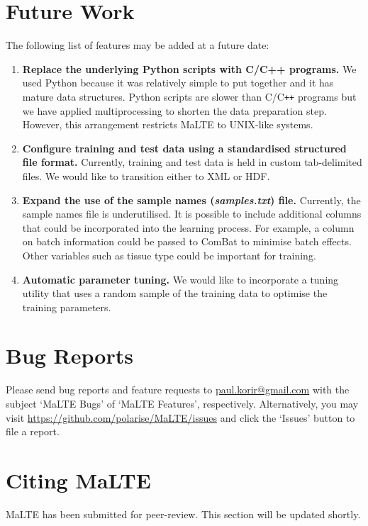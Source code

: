 \documentclass[a4paper,12pt]{article}
\begin{document}
\section{Future Work}
\label{future}
The following list of features may be added at a future date:
\begin{enumerate}
\item \textbf{Replace the underlying \textsf{Python} scripts with C/C++ programs.} We used \textsf{Python} because it was relatively simple to put together and it has mature data structures. \textsf{Python} scripts are slower than \textsf{C/C}\verb!++! programs but we have applied multiprocessing to shorten the data preparation step. However, this arrangement restricts \textsf{MaLTE} to UNIX-like systems.
\item \textbf{Configure training and test data using a standardised structured file format.} Currently, training and test data is held in custom tab-delimited files. We would like to transition either to XML or HDF.
\item \textbf{Expand the use of the sample names (\textit{samples.txt}) file.} Currently, the sample names file is underutilised. It is possible to include additional columns that could be incorporated into the learning process. For example, a column on batch information could be passed to \textsf{ComBat} to minimise batch effects. Other variables such as tissue type could be important for training.
\item \textbf{Automatic parameter tuning.} We would like to incorporate a tuning utility that uses a random sample of the training data to optimise the training parameters.
\end{enumerate}

\section{Bug Reports}
\label{bugs}
Please send bug reports and feature requests to \href{mailto:paul.korir@gmail.com}{paul.korir@gmail.com} with the subject `MaLTE Bugs' of `MaLTE Features', respectively. Alternatively, you may visit \url{https://github.com/polarise/MaLTE/issues} and click the `Issues' button to file a report.

\section{Citing \textsf{MaLTE}}
\textsf{MaLTE} has been submitted for peer-review. This section will be updated shortly.
\end{document}

